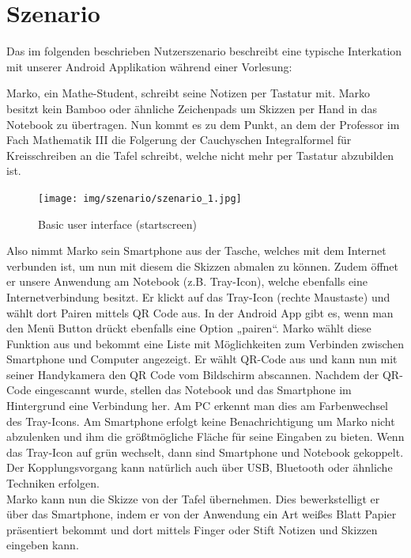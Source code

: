 \documentclass{chi-ext}
\begin{document}
\section{Szenario}
Das im folgenden beschrieben Nutzerszenario beschreibt eine typische Interkation mit unserer Android Applikation während einer Vorlesung:


Marko, ein Mathe-Student, schreibt seine Notizen per Tastatur mit. Marko besitzt kein Bamboo oder ähnliche Zeichenpads um Skizzen per Hand in das Notebook zu übertragen. Nun kommt es zu dem Punkt, an dem der Professor im Fach Mathematik III die Folgerung der Cauchyschen Integralformel für Kreisschreiben an die Tafel schreibt, welche nicht mehr per Tastatur abzubilden ist.

\begin{figure}
  \centering
  \texttt{[image: img/szenario/szenario\_1.jpg]}
  \caption{Basic user interface (startscreen)}
  \label{fig:mockup_startscreen}
\end{figure}

Also nimmt Marko sein Smartphone aus der Tasche, welches mit dem Internet verbunden ist, um nun mit diesem die Skizzen abmalen zu können. Zudem öffnet er unsere Anwendung am Notebook (z.B. Tray-Icon), welche ebenfalls eine Internetverbindung besitzt. Er klickt auf das Tray-Icon (rechte Maustaste) und wählt dort Pairen mittels QR Code aus. In der Android App gibt es, wenn man den Menü Button drückt ebenfalls eine Option „pairen“. Marko wählt diese Funktion aus und bekommt eine Liste mit Möglichkeiten zum Verbinden zwischen Smartphone und Computer angezeigt. Er wählt QR-Code aus und kann nun mit seiner Handykamera den QR Code vom Bildschirm abscannen. Nachdem der QR-Code eingescannt wurde, stellen das Notebook und das Smartphone im Hintergrund eine Verbindung her. Am PC erkennt man dies am Farbenwechsel des Tray-Icons. Am Smartphone erfolgt keine Benachrichtigung um Marko nicht abzulenken und ihm die größtmögliche Fläche für seine Eingaben zu bieten. Wenn das Tray-Icon auf grün wechselt, dann sind Smartphone und Notebook gekoppelt. Der Kopplungsvorgang kann natürlich auch über USB, Bluetooth oder ähnliche Techniken erfolgen.\\
Marko kann nun die Skizze von der Tafel übernehmen. Dies bewerkstelligt er über das Smartphone, indem er von der Anwendung ein Art weißes Blatt Papier präsentiert bekommt und dort mittels Finger oder Stift Notizen und Skizzen eingeben kann.
\end{document}
